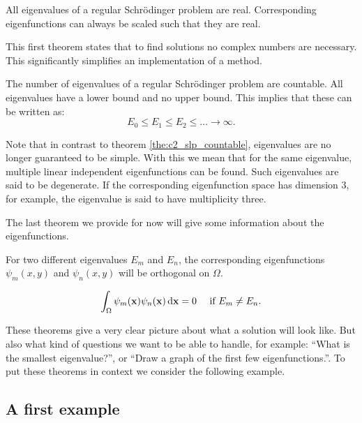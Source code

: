 \begin{theorem}\label{the:c3_real_eigenvalues}
  All eigenvalues of a regular Schrödinger problem are real. Corresponding eigenfunctions can always be scaled such that they are real.
\end{theorem}

This first theorem states that to find solutions no complex numbers are necessary. This significantly simplifies an implementation of a method.

\begin{theorem}\label{the:c3_eigs_countable}
  The number of eigenvalues of a regular Schrödinger problem are countable. All eigenvalues have a lower bound and no upper bound. This implies that these can be written as:
  $$
    E_0 \leq E_1 \leq E_2 \leq \dots \to \infty \text{.}
  $$
\end{theorem}

Note that in contrast to theorem \ref{the:c2_slp_countable}, eigenvalues are no longer guaranteed to be simple. With this we mean that for the same eigenvalue, multiple linear independent eigenfunctions can be found. Such eigenvalues are said to be degenerate. If the corresponding eigenfunction space has dimension $3$, for example, the eigenvalue is said to have multiplicity three.

The last theorem we provide for now will give some information about the eigenfunctions.

\begin{theorem}\label{the:c3_eigs_othogonal}
  For two different eigenvalues $E_m$ and $E_n$, the corresponding eigenfunctions $\psi_m(x, y)$ and $\psi_n(x, y)$ will be orthogonal on $\Omega$.

  $$
    \int_\Omega \psi_m(\vb{x}) \psi_n(\vb{x}) \, \dd \vb{x} = 0 \quad \text{ if $E_m \neq E_n$.}
  $$
\end{theorem}

These theorems give a very clear picture about what a solution will look like. But also what kind of questions we want to be able to handle, for example: ``What is the smallest eigenvalue?'', or ``Draw a graph of the first few eigenfunctions.''. To put these theorems in context we consider the following example.

\subsection{A first example}\label{sec:c3_first_example}

